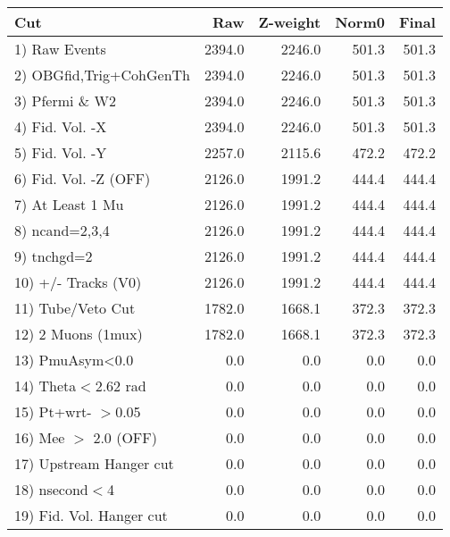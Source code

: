  \begin{table}[h!]\centering
 \begin{tabular}{||l||r|r|r|r||}
 \hline
 \hline
 Cut & Raw & Z-weight & Norm0 & Final \\
 \hline
  1) Raw Events           &      2394.0 &      2246.0 &       501.3 &       501.3 \\
  2) OBGfid,Trig+CohGenTh &      2394.0 &      2246.0 &       501.3 &       501.3 \\
  3) Pfermi \& W2         &      2394.0 &      2246.0 &       501.3 &       501.3 \\
  4) Fid. Vol. -X         &      2394.0 &      2246.0 &       501.3 &       501.3 \\
  5) Fid. Vol. -Y         &      2257.0 &      2115.6 &       472.2 &       472.2 \\
  6) Fid. Vol. -Z (OFF)   &      2126.0 &      1991.2 &       444.4 &       444.4 \\
  7) At Least 1 Mu        &      2126.0 &      1991.2 &       444.4 &       444.4 \\
  8) ncand=2,3,4          &      2126.0 &      1991.2 &       444.4 &       444.4 \\
  9) tnchgd=2             &      2126.0 &      1991.2 &       444.4 &       444.4 \\
 10) +/- Tracks (V0)      &      2126.0 &      1991.2 &       444.4 &       444.4 \\
 11) Tube/Veto Cut        &      1782.0 &      1668.1 &       372.3 &       372.3 \\
 12) 2 Muons (1mux)       &      1782.0 &      1668.1 &       372.3 &       372.3 \\
 13) PmuAsym<0.0          &         0.0 &         0.0 &         0.0 &         0.0 \\
 14) Theta$<$2.62 rad     &         0.0 &         0.0 &         0.0 &         0.0 \\
 15) Pt+wrt- $>$0.05      &         0.0 &         0.0 &         0.0 &         0.0 \\
 16) Mee $>$ 2.0  (OFF)   &         0.0 &         0.0 &         0.0 &         0.0 \\
 17) Upstream Hanger cut  &         0.0 &         0.0 &         0.0 &         0.0 \\
 18) nsecond$<$4          &         0.0 &         0.0 &         0.0 &         0.0 \\
 19) Fid. Vol. Hanger cut &         0.0 &         0.0 &         0.0 &         0.0 \\

\end{tabular}
\end{table}
